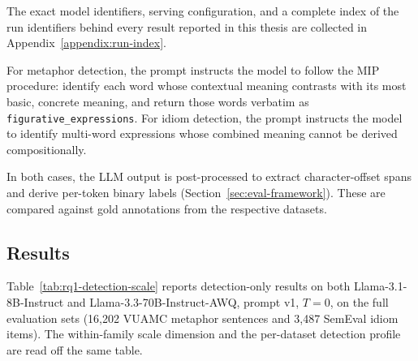 The exact model identifiers, serving configuration, and a complete index of the run identifiers behind every result reported in this thesis are collected in Appendix~\ref{appendix:run-index}.

For metaphor detection, the prompt instructs the model to follow the MIP procedure: identify each word whose contextual meaning contrasts with its most basic, concrete meaning, and return those words verbatim as \texttt{figurative\_expressions}. For idiom detection, the prompt instructs the model to identify multi-word expressions whose combined meaning cannot be derived compositionally.

In both cases, the LLM output is post-processed to extract character-offset spans and derive per-token binary labels (Section~\ref{sec:eval-framework}). These are compared against gold annotations from the respective datasets.

\subsection{Results}

Table~\ref{tab:rq1-detection-scale} reports detection-only results on both Llama-3.1-8B-Instruct and Llama-3.3-70B-Instruct-AWQ, prompt v1, $T=0$, on the full evaluation sets (16{,}202 VUAMC metaphor sentences and 3{,}487 SemEval idiom items). The within-family scale dimension and the per-dataset detection profile are read off the same table.

\begin{table}[h!]
\centering
{}
\caption{Zero-shot detection results across model scales, on the full evaluation sets ($T=0$, prompt v1). Token-level metrics are not reported for SemEval, whose gold annotations are span- and sentence-level only. Scaling from 8B to 70B-AWQ lifts idiom sentence F1 by $+19.6$pp (0.333 $\to$ 0.529) but metaphor sentence F1 by only $+4.8$pp (0.254 $\to$ 0.302); on metaphor the gain is concentrated in token precision (0.238 $\to$ 0.355) while recall barely moves (0.183 $\to$ 0.212). Runs: VU 8B \texttt{2d322ad0}, VU 70B \texttt{d47a01fb}, SemEval 8B \texttt{8141d880}, SemEval 70B \texttt{7cbef03f}.}
\label{tab:rq1-detection-scale}
\end{table}

